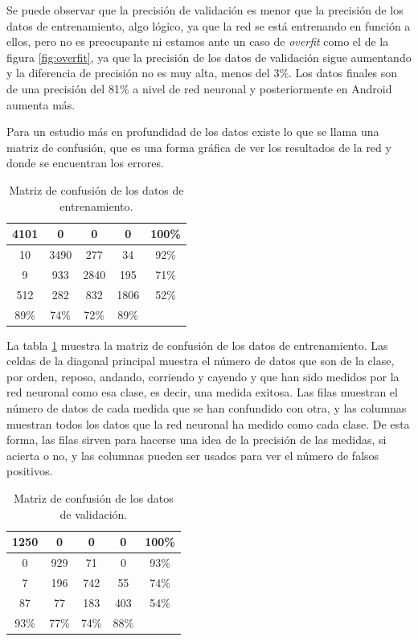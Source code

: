 \documentclass[12pt]{book}
\numberwithin{equation}{section}
\begin{document}
Se puede observar que la precisión de validación es menor que la precisión de los datos de entrenamiento, algo lógico, ya que la red se está entrenando en función a ellos, pero no es preocupante ni estamos ante un caso de \textit{overfit} como el de la figura \ref{fig:overfit}, ya que la precisión de los datos de validación sigue aumentando y la diferencia de precisión no es muy alta, menos del 3\%. Los datos finales son de una precisión del 81\% a nivel de red neuronal y posteriormente en Android aumenta más.

Para un estudio más en profundidad de los datos existe lo que se llama una matriz de confusión, que es una forma gráfica de ver los resultados de la red y donde se encuentran los errores.

\begin{table}
\centering
\begin{tabular} {| c | c | c | c | c |}
  \hline
  \cellcolor{green!25}4101 & 0 & 0 & 0 & 100\% \\
  \hline
  10 & \cellcolor{green!25}3490 & 277 & 34 & 92\% \\
  \hline
  9 & 933 & \cellcolor{green!25}2840 & 195 & 71\% \\
  \hline
  512 & 282 & 832 & \cellcolor{green!25}1806 & 52\% \\
  \hline
  89\% & 74\% & 72\% & 89\% & \\
  \hline
\end{tabular}
\caption{Matriz de confusión de los datos de entrenamiento.}
\label{confusionTraining}
\end{table}

La tabla \ref{confusionTraining} muestra la matriz de confusión de los datos de entrenamiento. Las celdas de la diagonal principal muestra el número de datos que son de la clase, por orden, reposo, andando, corriendo y cayendo y que han sido medidos por la red neuronal como esa clase, es decir, una medida exitosa. Las filas muestran el número de datos de cada medida que se han confundido con otra, y las columnas muestran todos los datos que la red neuronal ha medido como cada clase. De esta forma, las filas sirven para hacerse una idea de la precisión de las medidas, si acierta o no, y las columnas pueden ser usados para ver el número de falsos positivos.

\begin{table}
\centering
  \begin{tabular} {| c | c | c | c | c |}
  \hline
  \cellcolor{green!25}1250 & 0 & 0 & 0 & 100\% \\
  \hline
  0 & \cellcolor{green!25}929 & 71 & 0 & 93\% \\
  \hline
  7 & 196 & \cellcolor{green!25}742 & 55 & 74\% \\
  \hline
  87 & 77 & 183 & \cellcolor{green!25}403 & 54\% \\
  \hline
  93\% & 77\% & 74\% & 88\% & \\
  \hline
  \end{tabular}
    \caption{Matriz de confusión de los datos de validación.}
  \label{confusionValidation}
\end{table}
\end{document}
